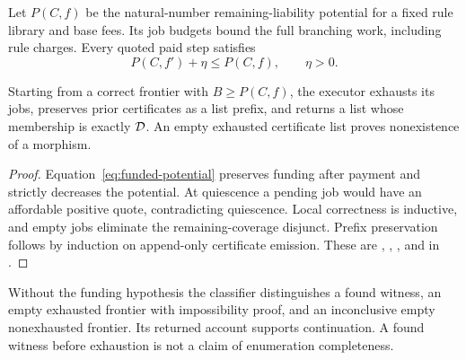 Let $P(C,f)$ be the natural-number remaining-liability potential for a fixed rule library and base fees. Its job budgets bound the full branching work, including rule charges. Every quoted paid step satisfies
\begin{equation}\label{eq:funded-potential}
 P(C,f')+\eta\le P(C,f),\qquad\eta>0.
\end{equation}
\begin{theorem}\label{thm:funded-search}
Starting from a correct frontier with $B\ge P(C,f)$, the executor exhausts its jobs, preserves prior certificates as a list prefix, and returns a list whose membership is exactly $\mathcal D$. An empty exhausted certificate list proves nonexistence of a morphism.
\end{theorem}
\begin{proof}
Equation~\eqref{eq:funded-potential} preserves funding after payment and strictly decreases the potential. At quiescence a pending job would have an affordable positive quote, contradicting quiescence. Local correctness is inductive, and empty jobs eliminate the remaining-coverage disjunct. Prefix preservation follows by induction on append-only certificate emission. These are , , ,  and  in .
\end{proof}
Without the funding hypothesis the classifier distinguishes a found witness, an empty exhausted frontier with impossibility proof, and an inconclusive empty nonexhausted frontier. Its returned account supports continuation. A found witness before exhaustion is not a claim of enumeration completeness.

